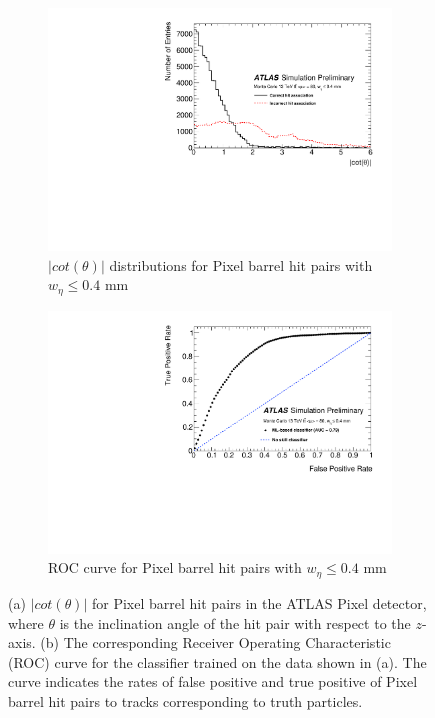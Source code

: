 \begin{figure}[!htbp]
\centering
    \begin{subfigure}[a]{0.9\textwidth}
        \includegraphics[width=\linewidth]{images/4-ml-based-predictor/histo.pdf}
        \caption{$\lvert cot(\theta) \rvert$ distributions for Pixel barrel hit pairs with $w_{\eta} \leq 0.4$ mm }
        \label{fig:truth-histo}
    \end{subfigure}
    \hfill
    \begin{subfigure}[b]{0.9\textwidth}
        \centering
        \includegraphics[width=\linewidth]{images/4-ml-based-predictor/roc.pdf}
        \caption{ROC curve for Pixel barrel hit pairs with $w_{\eta} \leq 0.4$ mm }
        \label{fig:roc-curve}
    \end{subfigure}
\caption{(a) $\lvert cot(\theta) \rvert$ for Pixel barrel hit pairs in the ATLAS Pixel detector, where $\theta$ is the inclination angle of the hit pair with respect to the $z$-axis. (b) The corresponding Receiver Operating Characteristic (ROC) curve for the classifier trained on the data shown in (a). The curve indicates the rates of false positive and true positive of Pixel barrel hit pairs to tracks corresponding to truth particles.}
\label{fig:1-dimensional-classifier-training}
\end{figure}



